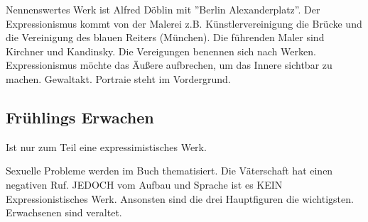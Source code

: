 \documentclass[12pt,a4paper]{article}
\begin{document}
Nennenswertes Werk ist Alfred Döblin mit ''Berlin Alexanderplatz''.
Der Expressionismus kommt von der Malerei z.B. Künstlervereinigung die Brücke und die Vereinigung des blauen Reiters (München). Die führenden Maler sind Kirchner und Kandinsky. Die Vereigungen benennen sich nach Werken. Expressionismus möchte das Äußere aufbrechen, um das Innere sichtbar zu machen. Gewaltakt. Portraie steht im Vordergrund.

\subsection{Frühlings Erwachen}

Ist nur zum Teil eine expressimistisches Werk.

Sexuelle Probleme werden im Buch thematisiert.
Die Väterschaft hat einen negativen Ruf.
JEDOCH vom Aufbau und Sprache ist es KEIN Expressionistisches Werk.
Ansonsten sind die drei Hauptfiguren die wichtigsten. Erwachsenen sind veraltet.
\end{document}
